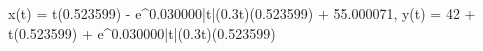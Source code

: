 x(t) = t\cos(0.523599) - e^{0.030000|t|}\sin(0.3t)\sin(0.523599) + 55.000071, \quad y(t) = 42 + t\sin(0.523599) + e^{0.030000|t|}\sin(0.3t)\cos(0.523599)
